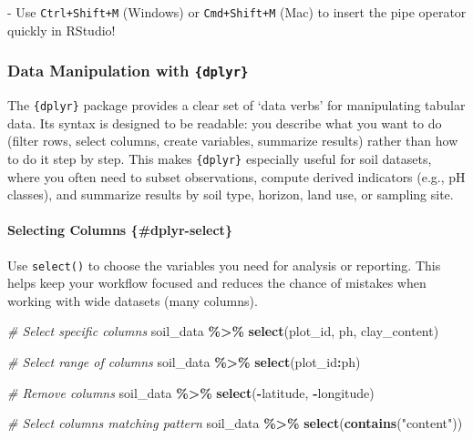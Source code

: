 \documentclass[
  10pt,
  b5paper,
  oneside]{book}
\newenvironment{Shaded}{\begin{snugshade}}{\end{snugshade}}
\newcommand{\CommentTok}[1]{\textcolor[rgb]{0.56,0.35,0.01}{\textit{#1}}}
\newcommand{\FunctionTok}[1]{\textcolor[rgb]{0.13,0.29,0.53}{\textbf{#1}}}
\newcommand{\NormalTok}[1]{#1}
\newcommand{\SpecialCharTok}[1]{\textcolor[rgb]{0.81,0.36,0.00}{\textbf{#1}}}
\newcommand{\StringTok}[1]{\textcolor[rgb]{0.31,0.60,0.02}{#1}}
\begin{document}
-️ Use \texttt{Ctrl+Shift+M} (Windows) or \texttt{Cmd+Shift+M} (Mac) to insert the pipe operator quickly in RStudio!

\subsubsection{\texorpdfstring{Data Manipulation with \texttt{\{dplyr\}}}{Data Manipulation with \{dplyr\}}}\label{manipulation-dplyr}

The \texttt{\{dplyr\}} package provides a clear set of `data verbs' for manipulating tabular data. Its syntax is designed to be readable: you describe what you want to do (filter rows, select columns, create variables, summarize results) rather than how to do it step by step. This makes \texttt{\{dplyr\}} especially useful for soil datasets, where you often need to subset observations, compute derived indicators (e.g., pH classes), and summarize results by soil type, horizon, land use, or sampling site.

\paragraph*{Selecting Columns \{\#dplyr-select\}}\label{selecting-columns-dplyr-select}

Use \texttt{select()} to choose the variables you need for analysis or reporting. This helps keep your workflow focused and reduces the chance of mistakes when working with wide datasets (many columns).

\begin{Shaded}
\begin{Highlighting}[]
\CommentTok{\# Select specific columns}
\NormalTok{soil\_data }\SpecialCharTok{\%\textgreater{}\%}
  \FunctionTok{select}\NormalTok{(plot\_id, ph, clay\_content)}

\CommentTok{\# Select range of columns}
\NormalTok{soil\_data }\SpecialCharTok{\%\textgreater{}\%}
  \FunctionTok{select}\NormalTok{(plot\_id}\SpecialCharTok{:}\NormalTok{ph)}

\CommentTok{\# Remove columns}
\NormalTok{soil\_data }\SpecialCharTok{\%\textgreater{}\%}
  \FunctionTok{select}\NormalTok{(}\SpecialCharTok{{-}}\NormalTok{latitude, }\SpecialCharTok{{-}}\NormalTok{longitude)}

\CommentTok{\# Select columns matching pattern}
\NormalTok{soil\_data }\SpecialCharTok{\%\textgreater{}\%}
  \FunctionTok{select}\NormalTok{(}\FunctionTok{contains}\NormalTok{(}\StringTok{"content"}\NormalTok{))}
\end{Highlighting}
\end{Shaded}
\end{document}
